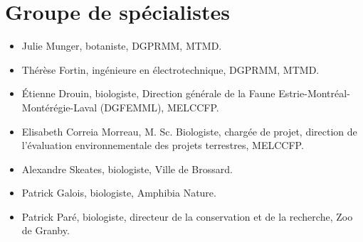 
\section*{Groupe de spécialistes}

\begin{itemize}
\item Julie Munger, botaniste, DGPRMM, MTMD.
\item Thérèse Fortin, ingénieure en électrotechnique, DGPRMM, MTMD.
\item Étienne Drouin, biologiste, Direction générale de la Faune Estrie-Montréal-Montérégie-Laval (DGFEMML), MELCCFP.
\item Elisabeth Correia Morreau, M. Sc. Biologiste, chargée de projet, direction de l'évaluation environnementale des projets terrestres, MELCCFP.
\item Alexandre Skeates, biologiste, Ville de Brossard.
\item Patrick Galois, biologiste, Amphibia Nature.
\item Patrick Paré, biologiste, directeur de la conservation et de la recherche, Zoo de Granby.
\end{itemize}